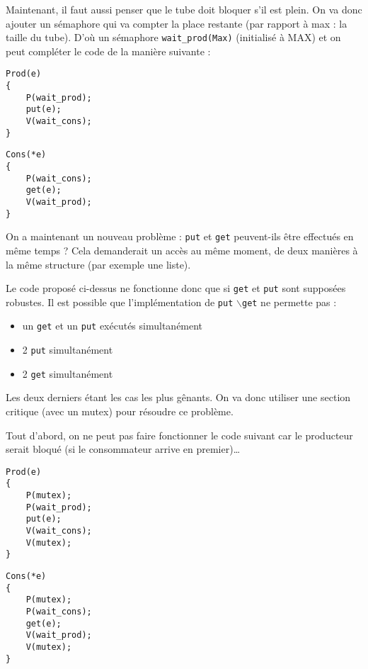\documentclass[12pt,a4paper]{report}
\begin{document}
Maintenant, il faut aussi penser que le tube doit bloquer s'il est plein. On va donc ajouter un sémaphore qui va compter la place restante (par rapport à max : la taille du tube). D'où un sémaphore \verb?wait_prod(Max)? (initialisé à MAX) et on peut compléter le code de la manière suivante :

\medskip

\begin{minipage}{0.5\linewidth}
\begin{verbatim}
Prod(e)
{
    P(wait_prod);
    put(e);
    V(wait_cons);
}
\end{verbatim}
\end{minipage}
\begin{minipage}{0.5\linewidth}
\begin{verbatim}
Cons(*e)
{
    P(wait_cons);
    get(e);
    V(wait_prod);
}
\end{verbatim}
\end{minipage}

\medskip

On a maintenant un nouveau problème : \verb?put? et \verb?get? peuvent-ils être effectués en même temps ? Cela demanderait un accès au même moment, de deux manières à la même structure (par exemple une liste).

Le code proposé ci-dessus ne fonctionne donc que si \verb?get? et \verb?put? sont supposées robustes. Il est possible que l'implémentation de \verb?put? $\backslash$\verb?get? ne permette pas :
\begin{itemize}
\item un \verb?get? et un \verb?put? exécutés simultanément
\item 2 \verb?put? simultanément
\item 2 \verb?get? simultanément\\
\end{itemize}

Les deux derniers étant les cas les plus gênants. On va donc utiliser une section critique (avec un mutex) pour résoudre ce problème.

Tout d'abord, on ne peut pas faire fonctionner le code suivant car le producteur serait bloqué (si le consommateur arrive en premier)\dots

\medskip

\begin{minipage}{0.5\linewidth}
\begin{verbatim}
Prod(e)
{
    P(mutex);
    P(wait_prod);
    put(e);
    V(wait_cons);
    V(mutex);
}
\end{verbatim}
\end{minipage}
\begin{minipage}{0.5\linewidth}
\begin{verbatim}
Cons(*e)
{
    P(mutex);
    P(wait_cons);
    get(e);
    V(wait_prod);
    V(mutex);
}
\end{verbatim}
\end{minipage}
\end{document}
